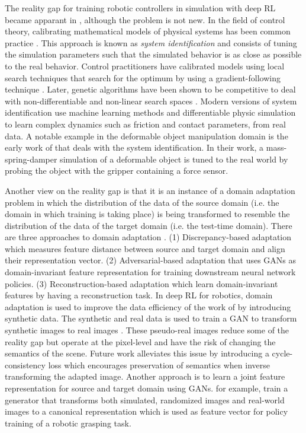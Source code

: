 \documentclass[\home/main.tex]{subfiles}
\begin{document}
The reality gap for training robotic controllers in simulation with deep RL became apparant in \autocite{Zhang2015}, although the problem is not new. In the field of control theory, calibrating mathematical models of physical systems has been common practice \autocite{ljung1983theory}. This approach is known as \emph{system identification} and consists of tuning the simulation parameters such that the simulated behavior is as close as possible to the real behavior. Control practitioners have calibrated models using local search techniques that search for the optimum by using a gradient-following technique \autocite{ljung1983theory}. Later, genetic algorithms have been shown to be competitive to deal with non-differentiable and non-linear search spaces \autocite{Kristinsson1992}. Modern versions of system identification use machine learning methods \autocite{chebotar2019closing} and differentiable physic simulation \autocite{heiden2021neuralsim} to learn complex dynamics such as friction and contact parameters, from real data. A notable example in the deformable object manipulation domain is the early work of \textcite{Howard2000} that deals with the system identification. In their work, a mass-spring-damper simulation of a deformable object is tuned to the real world by probing the object with the gripper containing a force sensor.

Another view on the reality gap is that it is an instance of a domain adaptation problem in which the distribution of the data of the source domain (i.e. the domain in which training is taking place) is being transformed to resemble the distribution of the data of the target domain (i.e. the test-time domain). There are three approaches to domain adaptation \autocite{Zhao2020}. (1) Discrepancy-based adaptation which measures feature distance between source and target domain and align their representation vector. (2) Adversarial-based adaptation that uses \glspl{GAN} as domain-invariant feature representation for training downstream neural network policies. (3) Reconstruction-based adaptation which learn domain-invariant features by having a reconstruction task.
In deep RL for robotics, domain adaptation is used to improve the data efficiency of the work of \autocite{Levine2016} by introducing synthetic data. The synthetic and real data is used to train a \gls{GAN} to transform synthetic images to real images \autocite{bousmalis2018using}. These pseudo-real images reduce some of the reality gap but operate at the pixel-level and have the risk of changing the semantics of the scene. Future work \autocite{rao2020rl} alleviates this issue by introducing a cycle-consistency loss which encourages preservation of semantics when inverse transforming the adapted image. Another approach is to learn a joint feature representation for source and target domain using \glspl{GAN}.\Textcite{james2019sim} for example, train a generator that transforms both simulated, randomized images and real-world images to a canonical representation which is used as feature vector for policy training of a robotic grasping task. 
\end{document}
